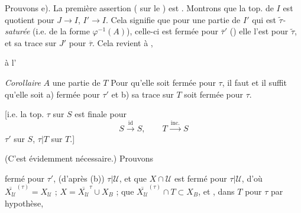 \documentclass[11pt,a4paper]{article}
\begin{document}
Prouvons e). La première assertion ( sur le )  est . Montrons que la top. de $I$ est quotient pour $J \to I$, $I' \to I$.  Cela signifie que  pour une partie de $I'$ qui est \emph{$\widetilde{\tau}$-saturée} (i.e. de la forme $\varphi^{-1}(A)$), \ill{} celle-ci est fermée pour $\overline{\tau}'$  () elle l'est pour $\widetilde{\tau}$, et sa trace sur $J'$  pour $\overline{\tau}$. Cela revient à , \struck{\ill{}}

  à l' 


\emph{Corollaire}   $A$ une partie de $T$ \struck{\ill{}}  Pour qu'elle soit fermée pour $\tau$, il faut et il suffit qu'elle soit a) fermée pour $\tau'$ et b)  sa trace sur $T$ soit fermée pour $\tau$.

[i.e. la top. $\tau$ sur $S$ est finale pour
\[
  S \xrightarrow{\ \mathrm{id}\ } S, \qquad T \xrightarrow{\ \mathrm{inc.}\ } S
\]
 $\tau'$ sur $S$, $\tau|T$ sur $T$.]

(C'est évidemment \struck{\ill{}} nécessaire.) Prouvons \ill{}

  \ill{} fermé pour $\tau'$, (d'après (b))  $\tau|\mathcal{U}$, \struck{\ill{}} et que $X \cap \mathcal{U}$  est fermé pour $\tau|\mathcal{U}$, d'où $\overline{X_{\mathcal{U}}}^{(\tau)} = X_{\mathcal{U}}$ ;  $X = \overline{X_{\mathcal{U}}}^{\tau} \cup X_B$ ; que $\overline{X_{\mathcal{U}}}^{(\tau)} \cap T \subset X_B$, et ,  \ill{}  dans $T$ pour $\tau$ par hypothèse,
\end{document}
